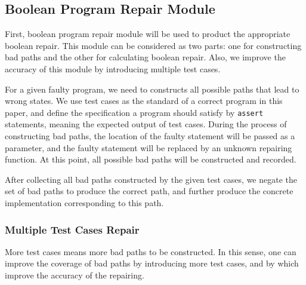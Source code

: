 \subsection{Boolean Program Repair Module}
First, boolean program repair module will be used to product the appropriate boolean repair. This module can be considered as two parts: one for constructing bad paths and the other for calculating boolean repair.
Also, we improve the accuracy of this module by introducing multiple test cases.

For a given faulty program, we need to constructs all possible paths that lead to wrong states.
We use test cases as the standard of a correct program in this paper, and define the specification a program should satisfy by \lstinline|assert| statements, meaning the expected output of test cases.
During the process of constructing bad paths, the location of the faulty statement will be passed as a parameter, and the faulty statement will be replaced by an unknown repairing function. At this point, all possible bad paths will be constructed and recorded.

After collecting all bad paths constructed by the given test cases, we negate the set of bad paths to produce the correct path, and further produce the concrete implementation corresponding to this path.

\subsubsection{Multiple Test Cases Repair}
\label{section:MultipleTestCasesRepair}
More test cases means more bad paths to be constructed. In this sense, one can improve the coverage of bad paths by introducing more test cases, and by which improve the accuracy of the repairing.


